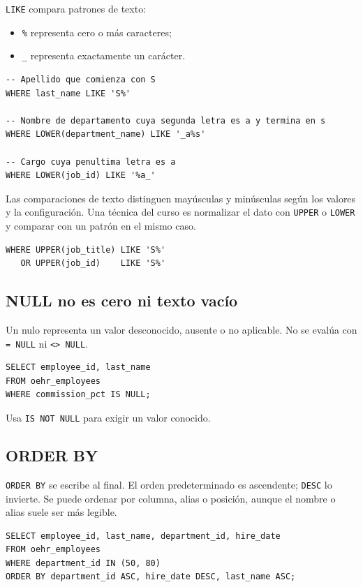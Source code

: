 \documentclass[11pt,a4paper]{article}
\newcommand{\campo}[1]{\texttt{#1}}
\begin{document}
\campo{LIKE} compara patrones de texto:

\begin{itemize}
  \item \campo{\%} representa cero o más caracteres;
  \item \campo{\_} representa exactamente un carácter.
\end{itemize}

\begin{lstlisting}
-- Apellido que comienza con S
WHERE last_name LIKE 'S%'

-- Nombre de departamento cuya segunda letra es a y termina en s
WHERE LOWER(department_name) LIKE '_a%s'

-- Cargo cuya penultima letra es a
WHERE LOWER(job_id) LIKE '%a_'
\end{lstlisting}

Las comparaciones de texto distinguen mayúsculas y minúsculas según los valores y la configuración.
Una técnica del curso es normalizar el dato con \campo{UPPER} o \campo{LOWER} y comparar con un patrón
en el mismo caso.

\begin{lstlisting}
WHERE UPPER(job_title) LIKE 'S%'
   OR UPPER(job_id)    LIKE 'S%'
\end{lstlisting}

\subsection{NULL no es cero ni texto vacío}

Un nulo representa un valor desconocido, ausente o no aplicable. No se evalúa con
\campo{= NULL} ni \campo{<> NULL}.

\begin{lstlisting}
SELECT employee_id, last_name
FROM oehr_employees
WHERE commission_pct IS NULL;
\end{lstlisting}

Usa \campo{IS NOT NULL} para exigir un valor conocido.

\subsection{ORDER BY}

\campo{ORDER BY} se escribe al final. El orden predeterminado es ascendente; \campo{DESC} lo invierte.
Se puede ordenar por columna, alias o posición, aunque el nombre o alias suele ser más legible.

\begin{lstlisting}
SELECT employee_id, last_name, department_id, hire_date
FROM oehr_employees
WHERE department_id IN (50, 80)
ORDER BY department_id ASC, hire_date DESC, last_name ASC;
\end{lstlisting}
\end{document}
